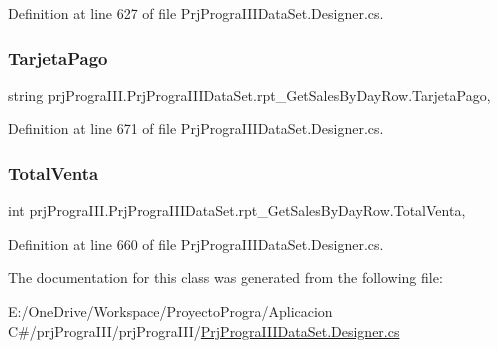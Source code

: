 Definition at line 627 of file Prj\+Progra\+I\+I\+I\+Data\+Set.\+Designer.\+cs.

\hypertarget{classprj_progra_i_i_i_1_1_prj_progra_i_i_i_data_set_1_1rpt___get_sales_by_day_row_adce0d9f03adf2cf633a590ab40f83e92}{}\label{classprj_progra_i_i_i_1_1_prj_progra_i_i_i_data_set_1_1rpt___get_sales_by_day_row_adce0d9f03adf2cf633a590ab40f83e92} 
\subsubsection{\texorpdfstring{Tarjeta\+Pago}{TarjetaPago}}
{\footnotesize\ttfamily string prj\+Progra\+I\+I\+I.\+Prj\+Progra\+I\+I\+I\+Data\+Set.\+rpt\+\_\+\+Get\+Sales\+By\+Day\+Row.\+Tarjeta\+Pago\hspace{0.3cm}{\ttfamily [get]}, {\ttfamily [set]}}



Definition at line 671 of file Prj\+Progra\+I\+I\+I\+Data\+Set.\+Designer.\+cs.

\hypertarget{classprj_progra_i_i_i_1_1_prj_progra_i_i_i_data_set_1_1rpt___get_sales_by_day_row_a12016acaca3c3eec09d339f2922e1405}{}\label{classprj_progra_i_i_i_1_1_prj_progra_i_i_i_data_set_1_1rpt___get_sales_by_day_row_a12016acaca3c3eec09d339f2922e1405} 
\subsubsection{\texorpdfstring{Total\+Venta}{TotalVenta}}
{\footnotesize\ttfamily int prj\+Progra\+I\+I\+I.\+Prj\+Progra\+I\+I\+I\+Data\+Set.\+rpt\+\_\+\+Get\+Sales\+By\+Day\+Row.\+Total\+Venta\hspace{0.3cm}{\ttfamily [get]}, {\ttfamily [set]}}



Definition at line 660 of file Prj\+Progra\+I\+I\+I\+Data\+Set.\+Designer.\+cs.



The documentation for this class was generated from the following file\+:\begin{DoxyCompactItemize}
\item 
E\+:/\+One\+Drive/\+Workspace/\+Proyecto\+Progra/\+Aplicacion C\#/prj\+Progra\+I\+I\+I/prj\+Progra\+I\+I\+I/\hyperlink{_prj_progra_i_i_i_data_set_8_designer_8cs}{Prj\+Progra\+I\+I\+I\+Data\+Set.\+Designer.\+cs}\end{DoxyCompactItemize}
